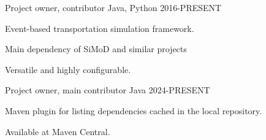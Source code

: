 \begin{cventries}
\cventry
{Project owner, contributor} %
{} %
{Java, Python} %
{2016-PRESENT} %
{
  \begin{cvitems} %
    \item {Event-based transportation simulation framework.}
    \item {Main dependency of SiMoD and similar projects}
    \item {Versatile and highly configurable.}
  \end{cvitems}
}   

\cventry
{Project owner, main contributor} %
{} %
{Java} %
{2024-PRESENT} %
{
  \begin{cvitems} %
    \item {Maven plugin for listing dependencies cached in the local repository.}
    \item {Available at Maven Central.}
  \end{cvitems}
}   


\end{cventries}
